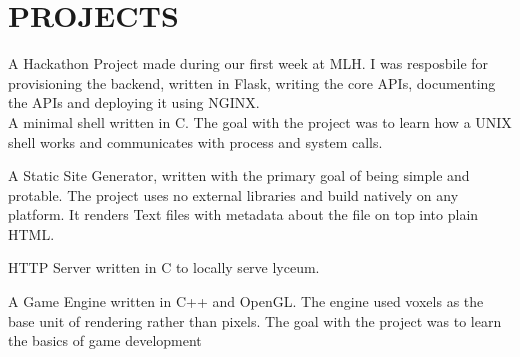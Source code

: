 \documentclass[]{resume-openfont}
\begin{document}
\begin{minipage}[t]{0.66\textwidth}

\section{PROJECTS}

A Hackathon Project made during our first week at MLH. I was resposbile for provisioning the backend, written in Flask, writing the core APIs, documenting the APIs and deploying it using NGINX.\\

\sectionsep
{}
A minimal shell written in C. The goal with the project was to learn how a UNIX shell works and communicates with process and system calls.\\
\sectionsep

A Static Site Generator, written with the primary goal of being simple and protable. The project uses no external libraries and build natively on any platform. It renders Text files with metadata about the file on top into plain HTML.\\
\sectionsep

HTTP Server written in C to locally serve lyceum.
\sectionsep

A Game Engine written in C++ and OpenGL. The engine used voxels as the base unit of rendering rather than pixels. The goal with the project was to learn the basics of game development\\
\sectionsep

\end{minipage}
\end{document}
